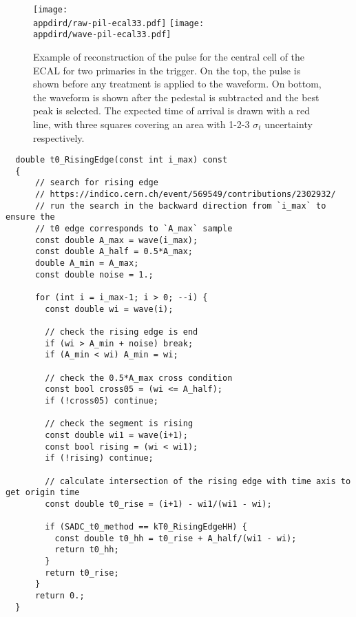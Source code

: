 \begin{figure}[bth!]
  \centering
  \texttt{[image: \\appdird/raw-pil-ecal33.pdf]}
  \texttt{[image: \\appdird/wave-pil-ecal33.pdf]}    
  \caption[example of pulse reconstruction with pileup in NA64]{Example of reconstruction of the pulse for the central cell of the ECAL for two primaries in the trigger. On the top, the pulse is shown before any treatment is applied to the waveform. On bottom, the waveform is shown after the pedestal is subtracted and the best peak is selected. The expected time of arrival is drawn with a red line, with three squares covering an area with 1-2-3 $\sigma_t$ uncertainty respectively.}
  \label{fig:pulse-example-pileup}
\end{figure}
\clearpage
\newpage
\FloatBarrier
\begin{lstlisting}
  double t0_RisingEdge(const int i_max) const
  {      
      // search for rising edge
      // https://indico.cern.ch/event/569549/contributions/2302932/
      // run the search in the backward direction from `i_max` to ensure the
      // t0 edge corresponds to `A_max` sample
      const double A_max = wave(i_max);
      const double A_half = 0.5*A_max;
      double A_min = A_max;
      const double noise = 1.;
      
      for (int i = i_max-1; i > 0; --i) {
        const double wi = wave(i);
        
        // check the rising edge is end
        if (wi > A_min + noise) break;
        if (A_min < wi) A_min = wi;
        
        // check the 0.5*A_max cross condition
        const bool cross05 = (wi <= A_half);
        if (!cross05) continue;
        
        // check the segment is rising
        const double wi1 = wave(i+1);
        const bool rising = (wi < wi1);
        if (!rising) continue;
        
        // calculate intersection of the rising edge with time axis to get origin time
        const double t0_rise = (i+1) - wi1/(wi1 - wi);
        
        if (SADC_t0_method == kT0_RisingEdgeHH) {
          const double t0_hh = t0_rise + A_half/(wi1 - wi);
          return t0_hh;
        }
        return t0_rise;
      }
      return 0.;
  }
\end{lstlisting}

